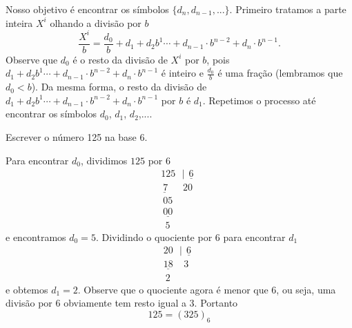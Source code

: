 Nosso objetivo é encontrar os símbolos $\{d_n, d_{n-1}, ...\}$. Primeiro tratamos a parte inteira $X^{i}$ olhando a divisão por $b$
$$
\frac{X^{i}}{b}=   \frac{d_0}{b}+d_1+d_2 b^1\cdots+d_{n-1}\cdot b^{n-2} +d_n\cdot b^{n-1}.
$$
Observe que $d_0$ é o resto da divisão de $X^i$ por $b$, pois $d_1+d_2 b^1\cdots+d_{n-1}\cdot b^{n-2} +d_n\cdot b^{n-1}$ é inteiro e $\frac{d_0}{b}$ é uma fração (lembramos que $d_0<b$). Da mesma forma, o resto da divisão de $d_1+d_2 b^1\cdots+d_{n-1}\cdot b^{n-2} +d_n\cdot b^{n-1}$ por $b$ é $d_1$. Repetimos o processo até encontrar os símbolos $d_0$, $d_1$, $d_2$,....
\begin{ex}Escrever o número 125 na base $6$.

Para encontrar $d_0$, dividimos $125$ por 6
$$
\begin{array}{l}
125 \ \ \ |\! \underline{\ \ 6\ \ } \\
\underline{\ 7 }\ \ \ \ \ \ \ 20\\
\ 05\\
\ \underline{00}\\
\ \ 5
\end{array}
$$
e encontramos $d_0=5$. Dividindo o quociente por $6$ para encontrar $d_1$
$$
\begin{array}{l}
20 \ \ \ |\! \underline{\ \ 6\ \ } \\
\underline{18 }\ \ \ \ \ 3\\
\ 2
\end{array}
$$
e obtemos $d_1=2$. Observe que o quociente agora é menor que $6$, ou seja, uma divisão por $6$ obviamente tem resto igual a $3$. Portanto
$$
125=(325)_6
$$
\end{ex}


